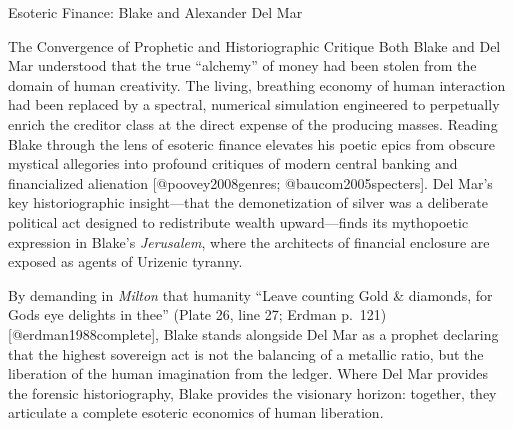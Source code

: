 \documentclass[
  ignorenonframetext,
]{beamer}
\begin{document}
\begin{frame}{Esoteric Finance: Blake and Alexander Del Mar}
\begin{block}{The Convergence of Prophetic and Historiographic Critique}
\protect{}\label{the-convergence-of-prophetic-and-historiographic-critique}
Both Blake and Del Mar understood that the true ``alchemy'' of money had
been stolen from the domain of human creativity. The living, breathing
economy of human interaction had been replaced by a spectral, numerical
simulation engineered to perpetually enrich the creditor class at the
direct expense of the producing masses. Reading Blake through the lens
of esoteric finance elevates his poetic epics from obscure mystical
allegories into profound critiques of modern central banking and
financialized alienation {[}@poovey2008genres; @baucom2005specters{]}.
Del Mar's key historiographic insight---that the demonetization of
silver was a deliberate political act designed to redistribute wealth
upward---finds its mythopoetic expression in Blake's \emph{Jerusalem},
where the architects of financial enclosure are exposed as agents of
Urizenic tyranny.

By demanding in \emph{Milton} that humanity ``Leave counting Gold \&
diamonds, for Gods eye delights in thee'' (Plate 26, line 27; Erdman
p.~121) {[}@erdman1988complete{]}, Blake stands alongside Del Mar as a
prophet declaring that the highest sovereign act is not the balancing of
a metallic ratio, but the liberation of the human imagination from the
ledger. Where Del Mar provides the forensic historiography, Blake
provides the visionary horizon: together, they articulate a complete
esoteric economics of human liberation.
\end{block}
\end{frame}
\end{document}
